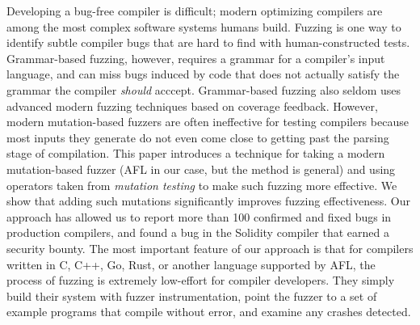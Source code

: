 Developing a bug-free compiler is difficult; modern optimizing compilers are among the most complex software systems humans build.  Fuzzing is one way to identify subtle compiler bugs that are hard to find with human-constructed tests.  Grammar-based fuzzing, however, requires a grammar for a compiler's input language, and can miss bugs induced by code that does not actually satisfy the grammar the compiler \emph{should} acccept.  Grammar-based fuzzing also seldom uses advanced modern fuzzing techniques based on coverage feedback.  However, modern mutation-based fuzzers are often ineffective for testing compilers because most inputs they generate do not even come close to getting past the parsing stage of compilation.   This paper introduces a technique for taking a modern mutation-based fuzzer (AFL in our case, but the method is general) and using operators taken from \emph{mutation testing} to make such fuzzing more effective.  We show that adding such mutations significantly improves fuzzing effectiveness.  Our approach has allowed us to report more than 100 confirmed and fixed bugs in production compilers, and found a bug in the Solidity compiler that earned a security bounty.  The most important feature of our approach is that for compilers written in C, C++, Go, Rust, or another language supported by AFL, the process of fuzzing is extremely low-effort for compiler developers.  They simply build their system with fuzzer instrumentation, point the fuzzer to a set of example programs that compile without error, and examine any crashes detected.
